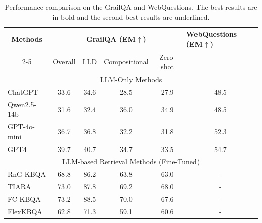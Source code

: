 \documentclass[lettersize,journal]{IEEEtran}
\begin{document}
\begin{table}[h]
\centering
\caption{Performance comparison on the GrailQA and WebQuestions. The best results are in bold and the second best results are underlined.}
\begin{tabular}{cccccc}
\toprule
\multirow{2}{*}{Methods} & \multicolumn{4}{c}{GrailQA (\textbf{EM}$\uparrow$)}                & \multicolumn{1}{l}{\multirow{2}{*}{WebQuestions (\textbf{EM}$\uparrow$)}} \\ \cmidrule{2-5}
                         & Overall & I.I.D & Compositional & Zero-shot & \multicolumn{1}{l}{}                              \\ \midrule
\multicolumn{6}{c}{LLM-Only Methods}                                                                                              \\ \midrule
\multicolumn{1}{l}{ChatGPT}                  & 33.6        & 34.6      & 28.5              & 27.9         &48.5                                                   \\
\multicolumn{1}{l}{Qwen2.5-14b}                  & 31.6        & 32.4      & 36.0              & 34.9         &48.5                                                   \\
\multicolumn{1}{l}{GPT-4o-mini}              & 36.7        & 36.8      & 32.2              & 31.8         &52.3                                                   \\
\multicolumn{1}{l}{GPT4}                  & 39.7        & 40.7      & 34.7              & 33.5         &54.7                                                  \\ \midrule
\multicolumn{6}{c}{LLM-based Retrieval Methods (Fine-Tuned)}                                                                           \\ \midrule
\multicolumn{1}{l}{RnG-KBQA}                 & 68.8    & 86.2  & 63.8          & 63.0     & -                                                 \\
\multicolumn{1}{l}{TIARA}                    & 73.0    & 87.8  & 69.2          & 68.0     & -                                                 \\
\multicolumn{1}{l}{FC-KBQA}                  & 73.2    & 88.5  & 70.0          & 67.6     & -                                                 \\
\multicolumn{1}{l}{FlexKBQA}                 & 62.8    & 71.3  & 59.1          & 60.6     & -                                                 \\

\end{tabular}
\end{table}
\end{document}
